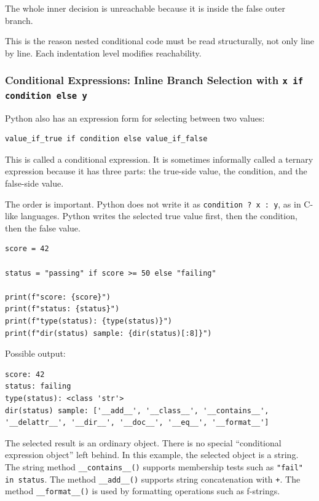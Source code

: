 The whole inner decision is unreachable because it is inside the false outer branch.

This is the reason nested conditional code must be read structurally, not only line by line. Each indentation level modifies reachability.

\subsubsection{Conditional Expressions: Inline Branch Selection with \texttt{x if condition else y}}

Python also has an expression form for selecting between two values:

\begin{verbatim}
value_if_true if condition else value_if_false
\end{verbatim}

This is called a conditional expression. It is sometimes informally called a ternary expression because it has three parts: the true-side value, the condition, and the false-side value.

The order is important. Python does not write it as \texttt{condition ? x : y}, as in C-like languages. Python writes the selected true value first, then the condition, then the false value.

\begin{verbatim}
score = 42

status = "passing" if score >= 50 else "failing"

print(f"score: {score}")
print(f"status: {status}")
print(f"type(status): {type(status)}")
print(f"dir(status) sample: {dir(status)[:8]}")
\end{verbatim}

Possible output:

\begin{verbatim}
score: 42
status: failing
type(status): <class 'str'>
dir(status) sample: ['__add__', '__class__', '__contains__', '__delattr__', '__dir__', '__doc__', '__eq__', '__format__']
\end{verbatim}

The selected result is an ordinary object. There is no special ``conditional expression object'' left behind. In this example, the selected object is a string. The string method \texttt{\_\_contains\_\_()} supports membership tests such as \texttt{"fail" in status}. The method \texttt{\_\_add\_\_()} supports string concatenation with \texttt{+}. The method \texttt{\_\_format\_\_()} is used by formatting operations such as f-strings.

